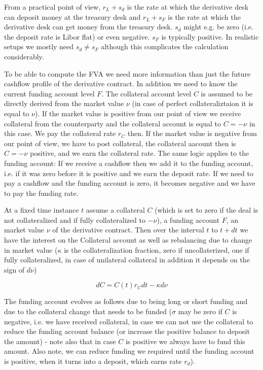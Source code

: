 \documentclass{amsart}
\theoremstyle{plain}
\numberwithin{equation}{section}
\begin{document}
From a practical point of view, $r_L+s_d$ is the rate at which the derivative desk can deposit money at the treasury desk and $r_L+s_F$ is the rate at which the derivative desk can get money from the treasury desk. $s_d$ might e.g. be zero (i.e. the deposit rate is Libor flat) or even negative. $s_F$ is typically positive. In realistic setups we mostly need $s_d \neq s_F$ although this complicates the calculation considerably.

To be able to compute the FVA we need more information than just the future cashflow profile of the derivative contract. In addition we need to know the current funding account level $F$. The collateral account level $C$ is assumed to be directly derived from the market value $\nu$ (in case of perfect collateraliztaion it is equal to $\nu$). If the market value is positive from our point of view we receive collateral from the counterparty and the collateral account is equal to $C=-\nu$ in this case. We pay the collateral rate $r_C$ then. If the market value is negative from our point of view, we have to post collateral, the collateral aacount then is $C=-\nu$ positive, and we earn the collateral rate. The same logic applies to the funding account: If we receive a cashflow then we add it to the funding account, i.e. if it was zero before it is positive and we earn the deposit rate. If we need to pay a cashflow and the funding account is zero, it becomes negative and we have to pay the funding rate.

At a fixed time instance $t$ assume a collateral $C$ (which is set to zero if the deal is not collateralized and if fully collateralized to $-\nu$), a funding account $F$, an market value $\nu$ of the derivative contract. Then over the interval $t$ to $t+dt$ we have the interest on the Collateral account as well as rebalancing due to change in market value ($\kappa$ is the collateralization fraction, zero if uncollaterized, one if fully collateralized, in case of unilateral collateral in addition it depends on the sign of $d\nu$)

\begin{equation}
dC = C(t) r_C  dt - \kappa d\nu
\end{equation}

The funding account evolves as follows due to being long or short funding and due to the collateral change that needs to be funded ($\sigma$ may be zero if $C$ is negative, i.e. we have received collateral, in case we can not use the collateral to reduce the funding account balance (or increase the positive balance to deposit the amount) - note also that in case $C$ is positive we always have to fund this amount. Also note, we can reduce funding we required until the funding account is positive, when it turns into a deposit, which earns rate $r_d$).
\end{document}
